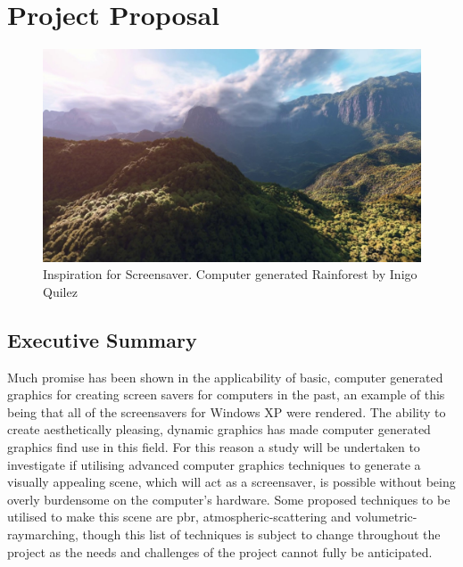 \documentclass[10pt, openany]{book}
\begin{document}
\thispagestyle{empty}


\tableofcontents
\newpage

\listoffigures
\newpage


\chapter{Project Proposal}

\begin{figure}[H]
        \centering
        \includegraphics[width=0.35\linewidth]{rainforest}
        \caption{Inspiration for Screensaver. Computer generated Rainforest by Inigo Quilez}
\end{figure} 

\section{Executive Summary}
Much promise has been shown in the applicability of basic, computer generated graphics for creating screen savers for computers in the past, an example of this being that all of the screensavers for Windows XP were rendered. The ability to create aesthetically pleasing, dynamic graphics has made computer generated graphics find use in this field. For this reason a study will be undertaken to investigate if utilising advanced computer graphics techniques to generate a visually appealing scene, which will act as a screensaver, is possible without being overly burdensome on the computer's hardware. Some proposed techniques to be utilised to make this scene are \gls{pbr}, \gls{atmospheric-scattering} and \gls{volumetric-raymarching}, though this list of techniques is subject to change throughout the project as the needs and challenges of the project cannot fully be anticipated.
\end{document}

